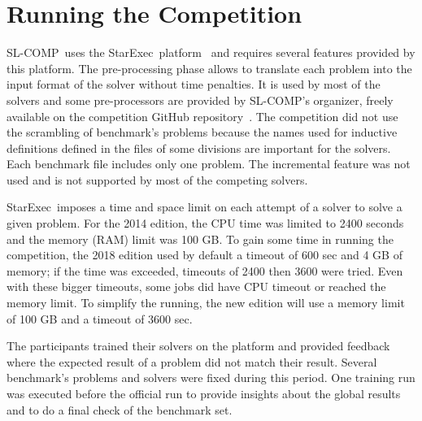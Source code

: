 \documentclass[orivec]{llncs}
\newcommand{\slcomp}{\textsf{SL-COMP}}
\newcommand{\starexec}{\textsf{StarExec}}
\begin{document}
\section{Running the Competition}
\label{sec:run}

\slcomp\ uses the \starexec\ platform~\cite{StarExecsite} 
and requires several features provided by this platform.
%
The pre-processing phase allows to translate each problem into the input
format of the solver without time penalties. It is used by most
of the solvers and some pre-processors are
provided by \slcomp's organizer, 
freely available on the competition GitHub repository~\cite{SLCOMPgit}.
%
The competition did not use the scrambling of benchmark's problems because the names used for inductive definitions defined in the files of some divisions are important for the solvers.
%
Each benchmark file includes only one problem. 
The incremental feature was not used and is not supported by most of the competing solvers.

\starexec\ imposes a time and space limit on each attempt of a solver to solve a given problem. For the 2014 edition, the CPU time was limited to 2400 seconds and
the memory (RAM) limit was 100 GB. 
To gain some time in running the competition, the 2018 edition used by default a timeout of 600 sec and 4 GB of memory; if the time was exceeded, timeouts of 2400 then 3600 were tried.
Even with these bigger timeouts, some jobs did have CPU timeout or reached the memory limit.
To simplify the running, the new edition will use a memory limit of 100 GB and a timeout of 3600 sec.

The participants trained their solvers on the platform and provided feedback where the expected result of a problem did not match their result. 
Several benchmark's problems and solvers were fixed during this period.
One training run was executed before the official run to provide insights about the global results and to do a final check of the benchmark set.
\end{document}
